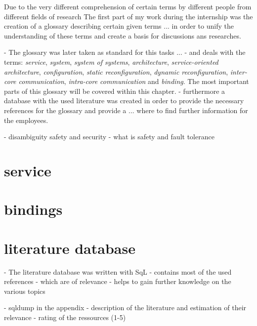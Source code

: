 Due to the very different comprehension of certain terms by different people from different fields of research 
The first part of my work during the internship was the creation of a glossary describing certain given terms
... in order to unify the understanding of these terms and create a basis for discussions ans researches.

- The glossary was later taken as standard for this tasks ...
- and deals with the terms: \emph{service}, \emph{system}, \emph{system of systems}, \emph{architecture}, \emph{service-oriented architecture}, \emph{configuration}, \emph{static reconfiguration}, \emph{dynamic reconfiguration}, \emph{inter-core communication}, \emph{intra-core communication} and \emph{binding}.
The most important parts of this glossary will be covered within this chapter.
- furthermore a database with the used literature was created in order to provide the necessary references for the glossary and provide a ... where to find further information for the employees. 

- disambiguity safety and security
- what is safety and fault tolerance

\section{service}

\section{bindings}

\section{literature database}
- The literature database was written with SqL
- contains most of the used references
- which are of relevance
- helps to gain further knowledge on the various topics

- sqldump in the appendix
- description of the literature and estimation of their relevance
- rating of the ressources (1-5)


